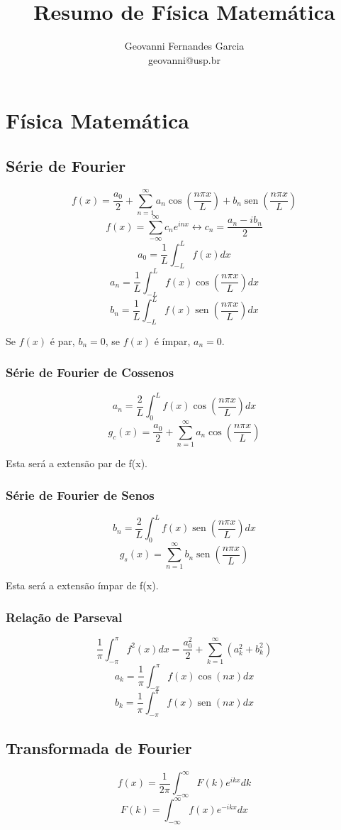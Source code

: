 \documentclass[a4paper,12pt]{article}
\title{Resumo de Física Matemática}
\author{Geovanni Fernandes Garcia \\ geovanni@usp.br}
\DeclareMathOperator{\sen}{sen}
\newcommand{\integral}{\displaystyle\int}
\begin{document}
\maketitle
\section{Física Matemática}
\subsection{Série de Fourier}
$$f(x) = \dfrac{a_0}{2} + \sum_{n=1}^{\infty} a_n\cos\left(\dfrac{n\pi x}{L}\right) + b_n\sen\left(\dfrac{n\pi x}{L}\right)$$
$$f(x) = \sum_{-\infty}^{\infty} c_ne^{inx} \longleftrightarrow c_n = \dfrac{a_n-ib_n}{2}$$
$$a_0 = \dfrac{1}{L}\integral_{-L}^L f(x)dx$$
$$a_n = \dfrac{1}{L}\integral_{-L}^L f(x)\cos\left(\dfrac{n\pi x}{L}\right)dx$$
$$b_n = \dfrac{1}{L}\integral_{-L}^L f(x)\sen\left(\dfrac{n\pi x}{L}\right)dx$$

Se $f(x)$ é par, $b_n = 0$, se $f(x)$ é ímpar, $a_n = 0$.
\subsubsection{Série de Fourier de Cossenos}
$$a_n = \dfrac{2}{L}\integral_0^L f(x)\cos\left(\dfrac{n\pi x}{L}\right)dx$$
$$g_c(x) = \dfrac{a_0}{2} + \sum_{n=1}^{\infty} a_n\cos\left(\dfrac{n\pi x}{L}\right)$$

Esta será a extensão par de f(x).
\subsubsection{Série de Fourier de Senos}
$$b_n = \dfrac{2}{L}\integral_0^L f(x)\sen\left(\dfrac{n\pi x}{L}\right)dx$$
$$g_s(x) = \sum_{n=1}^{\infty} b_n\sen\left(\dfrac{n\pi x}{L}\right)$$

Esta será a extensão ímpar de f(x).
\subsubsection{Relação de Parseval}
$$\dfrac{1}{\pi}\integral_{-\pi}^{\pi} f^2(x)dx = \dfrac{a_0^2}{2} + \sum_{k=1}^{\infty} (a_k^2 + b_k^2)$$
$$a_k = \dfrac{1}{\pi}\integral_{-\pi}^{\pi} f(x)\cos\left(nx\right)dx$$
$$b_k = \dfrac{1}{\pi}\integral_{-\pi}^{\pi} f(x)\sen\left(nx\right)dx$$
\subsection{Transformada de Fourier}
$$f(x) = \dfrac{1}{2\pi}\integral_{-\infty}^{\infty} F(k)e^{ikx}dk$$
$$F(k) = \integral_{-\infty}^{\infty} f(x)e^{-ikx}dx$$
\end{document}
